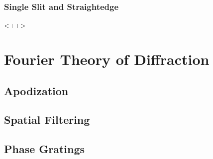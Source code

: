 \documentclass[../electromagnetism.tex]{subfiles}
\begin{document}
\subsubsection{Single Slit and Straightedge}
<++>
\section{Fourier Theory of Diffraction}
\subsection{Apodization}
\subsection{Spatial Filtering}
\subsection{Phase Gratings}
\end{document}
